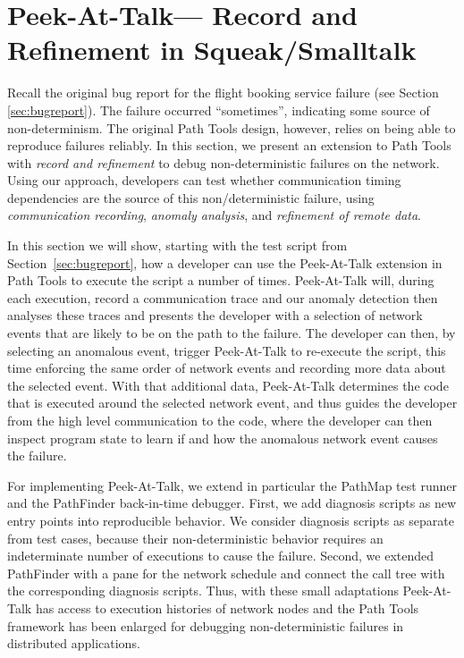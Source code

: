 \documentclass[preprint,3p]{elsarticle}
\newcommand{\toolname}{Peek-At-Talk\xspace}
\begin{document}
\section{\toolname --- Record and Refinement in Squeak/Smalltalk}
\label{sec:approach}

Recall the original bug report for the flight booking service failure
(see Section\,\ref{sec:bugreport}). The failure occurred ``sometimes'',
indicating some source of non-determinism. The original Path Tools
design, however, relies on being able to reproduce failures
reliably. In this section, we present an extension to Path Tools with
\emph{record and refinement} to debug non-deterministic failures on
the network. Using our approach, developers can test whether
communication timing dependencies are the source of this
non\-/deterministic failure, using \emph{communication recording},
\emph{anomaly analysis}, and \emph{refinement of remote data}.

In this section we will show, starting with the test script from
Section~\ref{sec:bugreport}, how a developer can use the \toolname extension in
Path Tools to execute the script a number of times. \toolname will, during each
execution, record a communication trace and our anomaly detection then analyses
these traces and presents the developer with a selection of network events that
are likely to be on the path to the failure. The developer can then, by selecting an
anomalous event, trigger \toolname to re-execute the script, this time enforcing
the same order of network events and recording more data about the selected
event. With that additional data, \toolname determines the code that is executed
around the selected network event, and thus guides the developer from the high
level communication to the code, where the developer can then inspect program
state to learn if and how the anomalous network event causes the failure.

For implementing \toolname, we extend in particular the PathMap
test runner and the PathFinder back-in-time debugger. First, we
add diagnosis scripts as new entry points into reproducible
behavior.
We consider diagnosis scripts as separate from test cases, because
their non-deterministic behavior requires an indeterminate number of
executions to cause the failure.
Second, we extended PathFinder with a pane for the network schedule and connect the
call tree with the corresponding diagnosis scripts.  Thus, with these
small adaptations \toolname has access to execution histories of
network nodes and the Path Tools framework has been enlarged for
debugging non-deterministic failures in distributed applications.
\end{document}
